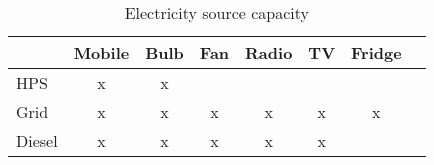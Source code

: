 \begin{table}[htbp]\centering
\caption{Electricity source capacity}
\begin{tabular}{l*{7}{c}}
\toprule
                &     Mobile&      Bulb&     Fan & Radio & TV  & Fridge\\
\midrule
HPS             &  x &   x &   & & & \\

Grid            &   x&    x&    x & x & x & x\\

Diesel          &    x &   x &   x & x & x  &\\

\bottomrule
\end{tabular}
\end{table}